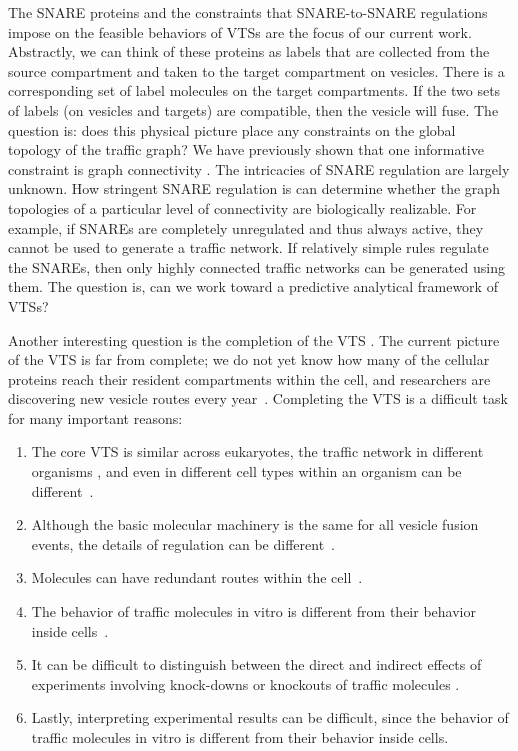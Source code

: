 The SNARE proteins and the constraints that SNARE-to-SNARE regulations
impose on the feasible behaviors of VTSs are the focus of
our current work.
%
Abstractly, we can think of these proteins as labels that are
collected from the source compartment and taken to the target
compartment on vesicles.
%
There is a corresponding set of label molecules on the target compartments.
%
If the two sets of labels (on vesicles and targets) are compatible,
then the vesicle will fuse.
%
The question is: does this physical picture place any constraints on
the global topology of the traffic graph? We have previously shown that one informative constraint is graph connectivity \cite{shukla2017discovering}.
%
The intricacies of SNARE regulation are largely unknown.
%
How stringent SNARE regulation is can determine whether the graph
topologies of a particular level of connectivity are biologically
realizable.
%
For example, if SNAREs are completely unregulated and thus always
active, they cannot be used to generate a traffic network.
%
If relatively simple rules regulate the SNAREs, then only
highly connected traffic networks can be generated using them.
%
The question is, can we work toward a predictive analytical framework
of VTSs?

Another interesting question is the completion of the VTS \cite{synthesisGupta}. 
%
The current picture of the VTS is far from complete; we do not yet know how many of the cellular proteins reach their resident compartments within the cell, and
researchers are discovering new vesicle routes every
year~\cite{nickel2018unconventional,weill2018toolbox}. 
%
Completing the VTS is a difficult task for many important reasons: 
\begin{enumerate}
	\item The core VTS is similar across eukaryotes, the traffic network in different organisms \cite{richardson2015evolutionary, barlow2017seeing}, and even in different cell types within an organism can be different~\cite{stoops2014trafficking,zhou2015arp2}.
	\item Although the basic molecular machinery is the same for all vesicle fusion events, the details of regulation can be different~\cite{davletov2007regulation,di2010calcium}.
	\item Molecules can have redundant routes within the cell~\cite{shimizu2014compensatory,nakatsukasa2014nutrient}.
	\item The behavior of traffic molecules in vitro is different from their behavior inside cells~\cite{furukawa2014multiple}. 
	\item It can be difficult to distinguish between the direct and indirect effects of experiments involving knock-downs or knockouts of traffic molecules \cite{hirst2004epsinr,mishev2013small}.
        \item Lastly, interpreting experimental results can be difficult, since the behavior of traffic molecules in vitro is different from their behavior inside cells.
\end{enumerate}

